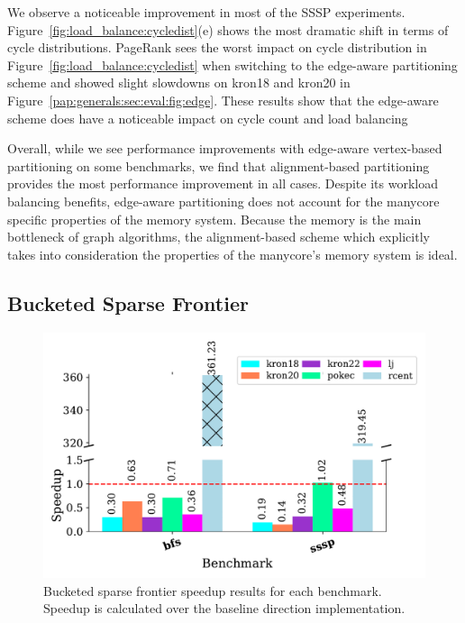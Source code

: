 We observe a noticeable improvement in most of the SSSP experiments.
Figure~\ref{fig:load_balance:cycledist}(e) shows the most dramatic shift in terms of cycle distributions. %
PageRank sees the worst impact on cycle distribution in Figure~\ref{fig:load_balance:cycledist} when switching to the edge-aware partitioning scheme and showed slight slowdowns on kron18 and kron20 in Figure~\ref{pap:generals:sec:eval:fig:edge}.
These results show that the edge-aware scheme does have a noticeable impact on cycle count and load balancing
 
Overall, while we see performance improvements with edge-aware vertex-based partitioning on some benchmarks, we find that alignment-based partitioning provides the most performance improvement in all cases. 
Despite its workload balancing benefits, edge-aware partitioning does not account for the manycore specific properties of the memory system.
Because the memory is the main bottleneck of graph algorithms, the alignment-based scheme which explicitly takes into consideration the properties of the manycore's memory system is ideal. 

\subsection{Bucketed Sparse Frontier}

\begin{figure}[!ht]
    \centering
    \includegraphics[scale=0.6]{graphit-figures/sparse.pdf}
    \caption{Bucketed sparse frontier speedup results for each benchmark. Speedup is calculated over the baseline \push direction implementation.} %
    \label{pap:cgo2020:sec:eval:fig:sparse}
\end{figure}

